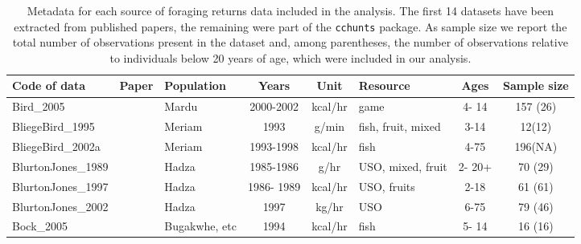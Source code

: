 \begin{landscape}
\begin{longtable}{M{2.6cm} M{3.6cm} M{1.5cm} c c M{1cm} c c}
\caption{Metadata for each source of foraging returns data included in the analysis. The first 14 datasets have been extracted from published papers, the remaining were part of the \texttt{cchunts} package. As sample size we report the total number of observations present in the dataset and, among parentheses, the number of observations relative to individuals below 20 years of age, which were included in our analysis. }\\
\hline
{} 
Code of data                  & Paper                                     & Population      & Years      & Unit      & Resource           & Ages    & Sample size \\ \hline
\endfirsthead
%
\endhead
%
Bird\_2005                     & \cite{bird_mardu_2005}                    & Mardu           & 2000-2002  & kcal/hr   & game               & 4- 14   & 157 (26)    \\
BliegeBird\_1995               & \cite{bird_children_1995}                 & Meriam          & 1993       & g/min     & fish, fruit, mixed & 3-14    & 12(12)      \\
BliegeBird\_2002a              & \cite{bird_constraints_2002}              & Meriam          & 1993-1998  & kcal/hr   & fish               & 4-75    & 196(NA)     \\
BlurtonJones\_1989             & \cite{blurton_jones_modelling_1989}       & Hadza           & 1985-1986  & g/hr      & USO, mixed, fruit  & 2- 20+  & 70 (29)     \\
BlurtonJones\_1997             & \cite{blurton_jones_why_1997}             & Hadza           & 1986- 1989 & kcal/hr   & USO, fruits        & 2-18    & 61 (61)     \\
BlurtonJones\_2002             & \cite{blurton_jones_selection_2002}       & Hadza           & 1997       & kg/hr     & USO                & 6-75    & 79 (46)     \\
Bock\_2005                     & \cite{bock_what_2005}                     & Bugakwhe, etc & 1994       & kcal/hr   & fish               & 5- 14   & 16 (16)     \\

\end{longtable}
\end{landscape}
